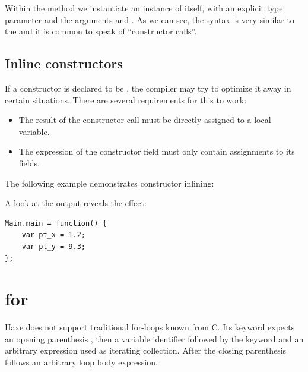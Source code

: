 \documentclass{haxe}
\begin{document}

Within the  method we instantiate an instance of  itself, with an explicit type parameter  and the arguments  and . As we can see, the syntax is very similar to the  and it is common to speak of ``constructor calls''.

\subsection{Inline constructors}
\label{expression-inline-constructor}


If a constructor is declared to be , the compiler may try to optimize it away in certain situations. There are several requirements for this to work:

\begin{itemize}
	\item The result of the constructor call must be directly assigned to a local variable.
	\item The expression of the constructor field must only contain assignments to its fields.
\end{itemize}

The following example demonstrates constructor inlining:


A look at the  output reveals the effect:

\begin{lstlisting}
Main.main = function() {
	var pt_x = 1.2;
	var pt_y = 9.3;
};
\end{lstlisting}



\section{for}
\label{expression-for}

Haxe does not support traditional for-loops known from C. Its  keyword expects an opening parenthesis \expr{(}, then a variable identifier followed by the keyword  and an arbitrary expression used as iterating collection. After the closing parenthesis \expr{)} follows an arbitrary loop body expression.
\end{document}
